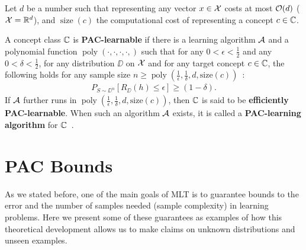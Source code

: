 Let \(d\) be a number such that representing any vector \(\rx \in \XX\) costs at most \(\OO(d)\) (\eg \(\XX = \Real^d\)), and \(\operatorname{size}(c)\) the computational cost of representing a concept \(c \in \CC\).
\begin{definition}
	A concept class \(\CC\) is \textbf{PAC-learnable} if there is a learning algorithm \(\AA\) and a polynomial function \(\operatorname{poly}(\cdot,\cdot, \cdot, \cdot, )\) such that for any \(0< \epsilon < \tfrac{1}{2}\) and any \(0< \delta < \tfrac{1}{2}\), for any distribution \(\DD\) on \(\XX\) and for any target concept \(c \in \CC\), the following holds for any sample size \(n \geq \operatorname{poly}(\tfrac{1}{\epsilon}, \tfrac{1}{\delta}, d, \text{size}(c))\)~\cite{mohri:2012}:
	\begin{align}
		P_{S \sim \DD^n}[R_{\DD}(h) \leq \epsilon] \geq (1 - \delta).
	\end{align}
	If \(\AA\) further runs in \(\operatorname{poly}(\tfrac{1}{\epsilon}, \tfrac{1}{\delta}, d, \text{size}(c))\), then \(\CC\) is said to be \textbf{efficiently PAC-learnable}. When such an algorithm \(\AA\) exists, it is called a \textbf{PAC-learning algorithm} for \(\CC\)~\cite{mohri:2012}.
\end{definition}


\section{PAC Bounds}
As we stated before, one of the main goals of \ac{MLT} is to guarantee bounds to the error and the number of samples needed (sample complexity) in learning problems. Here we present some of these guarantees as examples of how this theoretical development allows us to make claims on unknown distributions and unseen examples.

